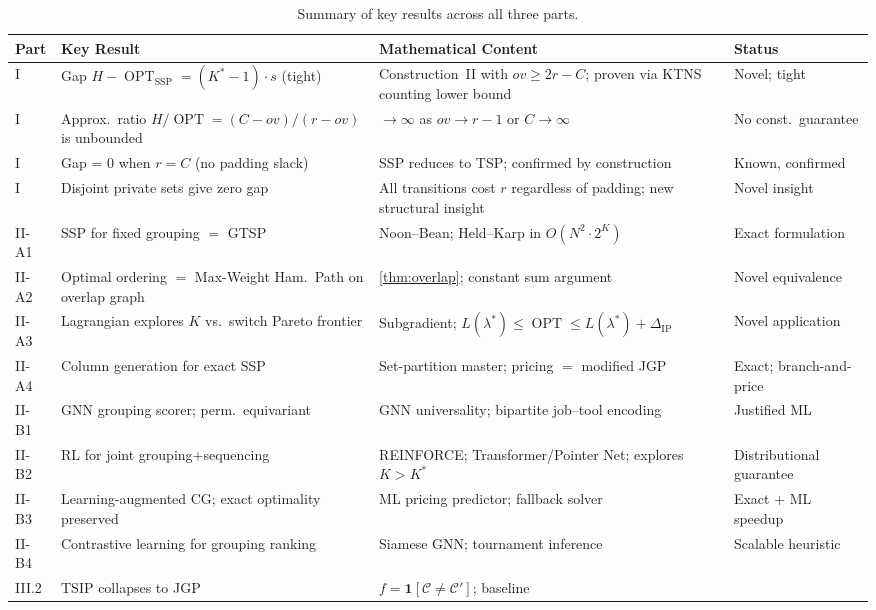 \documentclass[11pt,a4paper]{article}
\theoremstyle{plain}
\theoremstyle{definition}
\DeclareMathOperator{\OPT}{OPT}
\newcommand{\Heur}{H}               %
\newcommand{\Kstar}{K^{*}}          %
\begin{document}
\begin{table}[h!]
\centering
\caption{Summary of key results across all three parts.}
\label{tab:summary}
\renewcommand{\arraystretch}{1.3}
\small
\begin{tabularx}{\textwidth}{@{} l X X l @{}}
\toprule
\textbf{Part} & \textbf{Key Result} & \textbf{Mathematical Content} & \textbf{Status} \\
\midrule
I & Gap $\Heur - \OPT_{\text{SSP}} = (\Kstar-1)\cdot s$ (tight)
  & Construction~II with $\mathit{ov} \ge 2r-C$; proven via KTNS counting lower bound
  & Novel; tight \\
I & Approx.\ ratio $\Heur/\OPT = (C-\mathit{ov})/(r-\mathit{ov})$ is unbounded
  & $\to \infty$ as $\mathit{ov} \to r-1$ or $C \to \infty$
  & No const.\ guarantee \\
I & Gap = 0 when $r = C$ (no padding slack)
  & SSP reduces to TSP; confirmed by construction
  & Known, confirmed \\
I & Disjoint private sets give zero gap
  & All transitions cost $r$ regardless of padding; new structural insight
  & Novel insight \\
II-A1 & SSP for fixed grouping $=$ GTSP
  & Noon--Bean; Held--Karp in $O(N^2 \cdot 2^K)$
  & Exact formulation \\
II-A2 & Optimal ordering $=$ Max-Weight Ham.\ Path on overlap graph
  & \cref{thm:overlap}; constant sum argument
  & Novel equivalence \\
II-A3 & Lagrangian explores $K$ vs.\ switch Pareto frontier
  & Subgradient; $L(\lambda^*) \le \OPT \le L(\lambda^*)+\Delta_{\mathrm{IP}}$
  & Novel application \\
II-A4 & Column generation for exact SSP
  & Set-partition master; pricing $=$ modified JGP
  & Exact; branch-and-price \\
II-B1 & GNN grouping scorer; perm.\ equivariant
  & GNN universality; bipartite job--tool encoding
  & Justified ML \\
II-B2 & RL for joint grouping+sequencing
  & REINFORCE; Transformer/Pointer Net; explores $K > \Kstar$
  & Distributional guarantee \\
II-B3 & Learning-augmented CG; exact optimality preserved
  & ML pricing predictor; fallback solver
  & Exact + ML speedup \\
II-B4 & Contrastive learning for grouping ranking
  & Siamese GNN; tournament inference
  & Scalable heuristic \\
III.2 & TSIP collapses to JGP
  & $f = \mathbf{1}[\mathcal{C} \ne \mathcal{C}']$; baseline

\end{tabularx}
\end{table}
\end{document}
